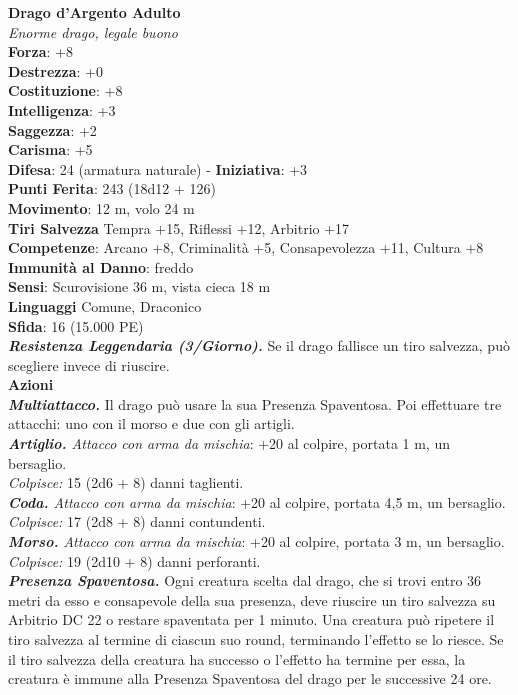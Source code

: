 \begin{multicols}{2}
\medskip\textbf{Drago d'Argento Adulto}\\
\emph{Enorme drago, legale buono}\\
\textbf{Forza}: +8\\
\textbf{Destrezza}: +0\\
\textbf{Costituzione}: +8\\
\textbf{Intelligenza}: +3\\
\textbf{Saggezza}: +2\\
\textbf{Carisma}: +5\\
\textbf{Difesa}: 24 (armatura naturale) - \textbf{Iniziativa}: +3\\
\textbf{Punti Ferita}: 243 (18d12 + 126)\\
\textbf{Movimento}: 12 m, volo 24 m\\
\textbf{Tiri Salvezza} Tempra +15, Riflessi +12, Arbitrio +17\\
\textbf{Competenze}: Arcano +8, Criminalità +5, Consapevolezza +11, Cultura +8\\
\textbf{Immunità al Danno}: freddo\\
\textbf{Sensi}: Scurovisione 36 m, vista cieca 18 m\\
\textbf{Linguaggi} Comune, Draconico\\
\textbf{Sfida}: 16 (15.000 PE)\smallskip\\
\emph{\textbf{Resistenza Leggendaria (3/Giorno).}} Se il drago fallisce un tiro salvezza, può scegliere invece di riuscire.\\
\smallskip\textbf{Azioni}\\
\emph{\textbf{Multiattacco.}} Il drago può usare la sua Presenza Spaventosa. Poi effettuare tre attacchi: uno con il morso e due con gli artigli.\\
\emph{\textbf{Artiglio.} Attacco con arma da mischia}: +20 al colpire, portata 1 m, un bersaglio.\\
\emph{Colpisce:} 15 (2d6 + 8) danni taglienti.\\
\emph{\textbf{Coda.} Attacco con arma da mischia}: +20 al colpire, portata 4,5 m, un bersaglio.\\
\emph{Colpisce:} 17 (2d8 + 8) danni contundenti.\\
\emph{\textbf{Morso.} Attacco con arma da mischia}: +20 al colpire, portata 3 m, un bersaglio.\\
\emph{Colpisce:} 19 (2d10 + 8) danni perforanti.\\
\emph{\textbf{Presenza Spaventosa.}} Ogni creatura scelta dal drago, che si trovi entro 36 metri da esso e consapevole della sua presenza, deve riuscire un tiro salvezza su Arbitrio DC  22 o restare spaventata per 1 minuto. Una creatura può ripetere il tiro salvezza al termine di ciascun suo round, terminando l'effetto se lo riesce. Se il tiro salvezza della creatura ha successo o l'effetto ha termine per essa, la creatura è immune alla Presenza Spaventosa del drago per le successive 24 ore.\\

\end{multicols}
